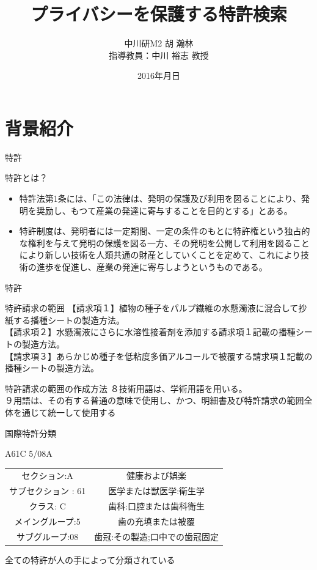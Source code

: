 \documentclass[14pt,xcolor=dvipsnames,table,dvipdfmx]{beamer}
\title{\bfseries プライバシーを保護する特許検索}
\date{2016年月日}
\author{中川研M2 胡 瀚林 \\ 指導教員：中川 裕志 教授}
\begin{document}
\maketitle
\frame{\tableofcontents[hideallsubsections]}

\section{背景紹介}
\begin{frame}{特許}
	\begin{block}{特許とは？}
		\begin{itemize}
        \item 特許法第1条には、「この法律は、発明の保護及び利用を図ることにより、発明を奨励し、もつて産業の発達に寄与することを目的とする」とある。
		\item 特許制度は、発明者には一定期間、一定の条件のもとに特許権という独占的な権利を与えて発明の保護を図る一方、その発明を公開して利用を図ることにより新しい技術を人類共通の財産としていくことを定めて、これにより技術の進歩を促進し、産業の発達に寄与しようというものである。
		\end{itemize}
	\end{block}
\end{frame}

\begin{frame}{特許}
    \begin{exampleblock}{特許請求の範囲}
		【請求項１】植物の種子をパルプ繊維の水懸濁液に混合して抄紙する播種シートの製造方法。\\
		【請求項２】水懸濁液にさらに水溶性接着剤を添加する請求項１記載の播種シートの製造方法。\\
		【請求項３】あらかじめ種子を低粘度多価アルコールで被覆する請求項１記載の播種シートの製造方法。
    \end{exampleblock}
	\begin{block}{特許請求の範囲の作成方法}
		８技術用語は、学術用語を用いる。\\
		９用語は、その有する普通の意味で使用し、かつ、明細書及び特許請求の範囲全体を通じて統一して使用する	
	\end{block}
\end{frame}

\begin{frame}{国際特許分類}
	\begin{exampleblock}{\center A61C 5/08A}
	\begin{tabular}{cc}
	セクション:A & 健康および娯楽 \\
 	サブセクション : 61 & 医学または獣医学:衛生学 \\
 	クラス: C & 歯科:口腔または歯科衛生 \\
 	メイングループ:5 & 歯の充填または被覆 \\
 	サブグループ:08 & 歯冠:その製造;口中での歯冠固定 \\
	\end{tabular}
	\end{exampleblock}
	\begin{block}{}
		全ての特許が人の手によって分類されている
	\end{block}
\end{frame}
\end{document}
